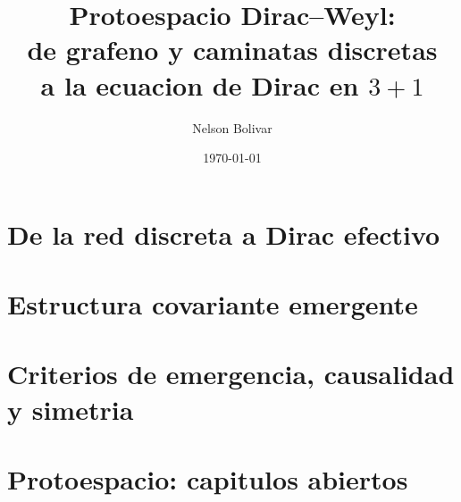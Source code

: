 \documentclass[11pt,openany]{book}
\title{Protoespacio Dirac--Weyl:\\
de grafeno y caminatas discretas\\
a la ecuacion de Dirac en \texorpdfstring{$3+1$}{(3+1)}}
\author{Nelson Bolivar}
\date{\today}
\begin{document}
\frontmatter
\maketitle
\tableofcontents





\mainmatter
\part{De la red discreta a Dirac efectivo}















\part{Estructura covariante emergente}




\part{Criterios de emergencia, causalidad y simetria}











\part{Protoespacio: capitulos abiertos}









\backmatter


\end{document}
